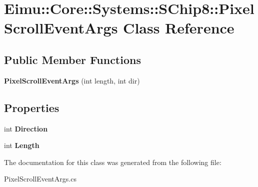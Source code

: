 \hypertarget{class_eimu_1_1_core_1_1_systems_1_1_s_chip8_1_1_pixel_scroll_event_args}{
\section{Eimu::Core::Systems::SChip8::PixelScrollEventArgs Class Reference}
\label{class_eimu_1_1_core_1_1_systems_1_1_s_chip8_1_1_pixel_scroll_event_args}
}
\subsection*{Public Member Functions}
\begin{DoxyCompactItemize}
\item 
\hypertarget{class_eimu_1_1_core_1_1_systems_1_1_s_chip8_1_1_pixel_scroll_event_args_a59b9e37f347c8682d4a6b95a3ccd1a69}{
{\bfseries PixelScrollEventArgs} (int length, int dir)}
\label{class_eimu_1_1_core_1_1_systems_1_1_s_chip8_1_1_pixel_scroll_event_args_a59b9e37f347c8682d4a6b95a3ccd1a69}

\end{DoxyCompactItemize}
\subsection*{Properties}
\begin{DoxyCompactItemize}
\item 
\hypertarget{class_eimu_1_1_core_1_1_systems_1_1_s_chip8_1_1_pixel_scroll_event_args_a727504630bbe31356336e8931cf170ed}{
int {\bfseries Direction}}
\label{class_eimu_1_1_core_1_1_systems_1_1_s_chip8_1_1_pixel_scroll_event_args_a727504630bbe31356336e8931cf170ed}

\item 
\hypertarget{class_eimu_1_1_core_1_1_systems_1_1_s_chip8_1_1_pixel_scroll_event_args_a28e84a12d50b1a4cd1cf1ef735d3d723}{
int {\bfseries Length}}
\label{class_eimu_1_1_core_1_1_systems_1_1_s_chip8_1_1_pixel_scroll_event_args_a28e84a12d50b1a4cd1cf1ef735d3d723}

\end{DoxyCompactItemize}


The documentation for this class was generated from the following file:\begin{DoxyCompactItemize}
\item 
PixelScrollEventArgs.cs\end{DoxyCompactItemize}
